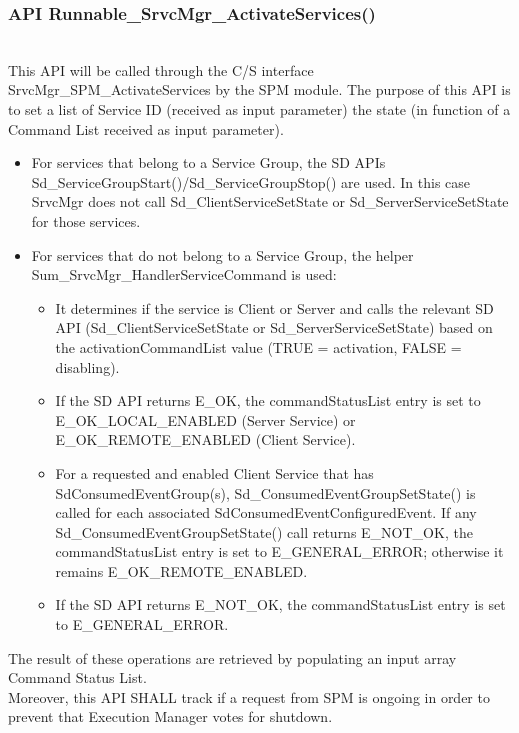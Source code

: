 {\subsubsection{API Runnable_SrvcMgr_ActivateServices()}
\\
This API will be called through the C/S interface SrvcMgr\_SPM\_ActivateServices by the SPM module.
The purpose of this API is to set a list of Service ID (received as input parameter) the state (in function of a Command List received as input parameter).
\begin{itemize}
    \item For services that belong to a Service Group, the SD APIs Sd\_ServiceGroupStart()/Sd\_ServiceGroupStop() are used. In this case SrvcMgr does not call Sd\_ClientServiceSetState or Sd\_ServerServiceSetState for those services.
    \item For services that do not belong to a Service Group, the helper Sum\_SrvcMgr\_HandlerServiceCommand is used:
    \begin{itemize}
        \item It determines if the service is Client or Server and calls the relevant SD API (Sd\_ClientServiceSetState or Sd\_ServerServiceSetState) based on the activationCommandList value (TRUE = activation, FALSE = disabling).
        \item If the SD API returns E\_OK, the commandStatusList entry is set to E\_OK\_LOCAL\_ENABLED (Server Service) or E\_OK\_REMOTE\_ENABLED (Client Service).
        \item For a requested and enabled Client Service that has SdConsumedEventGroup(s), Sd\_ConsumedEventGroupSetState() is called for each associated SdConsumedEventConfiguredEvent. If any Sd\_ConsumedEventGroupSetState() call returns E\_NOT\_OK, the commandStatusList entry is set to E\_GENERAL\_ERROR; otherwise it remains E\_OK\_REMOTE\_ENABLED.
        \item If the SD API returns E\_NOT\_OK, the commandStatusList entry is set to E\_GENERAL\_ERROR.
    \end{itemize}
\end{itemize}
The result of these operations are retrieved by populating an input array Command Status List.
{      }
{}
\\
Moreover, this API SHALL track if a request from SPM is ongoing in order to prevent that Execution Manager votes for shutdown.
{ }
}
